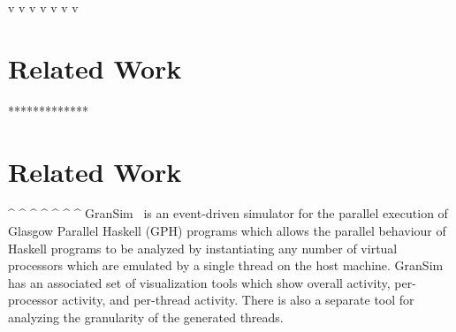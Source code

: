 v v v v v v v

\section{Related Work}

*************

\section{Related Work}
^ ^ ^ ^ ^ ^ ^
GranSim~\cite{loidl} is an event-driven simulator for the parallel execution of Glasgow Parallel Haskell (GPH) programs which allows the parallel behaviour of Haskell programs to be analyzed by instantiating any number of virtual processors which are emulated by a single thread on the host machine. GranSim has an associated set of visualization tools which show overall activity, per-processor activity, and per-thread activity. There is also a separate tool for analyzing the granularity of the generated threads.
